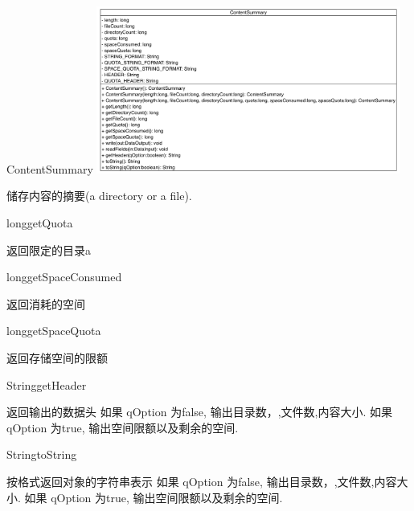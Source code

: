 \begin{XeClass}{ContentSummary}
\includegraphics[width=10cm]{cdig/ContentSummary.png}
     
 储存内容的摘要(a directory or a file).

    \begin{XeMethod}{\XePublic}{long}{getQuota}
         
 返回限定的目录a 

    \end{XeMethod}

    \begin{XeMethod}{\XePublic}{long}{getSpaceConsumed}
         
 返回消耗的空间 

    \end{XeMethod}

    \begin{XeMethod}{\XePublic}{long}{getSpaceQuota}
         
 返回存储空间的限额 

    \end{XeMethod}

    \begin{XeMethod}{\XePublic}{String}{getHeader}
         
 返回输出的数据头
 如果 qOption 为false, 输出目录数，,文件数,内容大小.
 如果 qOption 为true, 输出空间限额以及剩余的空间.

    \end{XeMethod}

    \begin{XeMethod}{\XePublic}{String}{toString}
         
 按格式返回对象的字符串表示
 如果 qOption 为false, 输出目录数，,文件数,内容大小.
 如果 qOption 为true, 输出空间限额以及剩余的空间.

    \end{XeMethod}

\end{XeClass}
